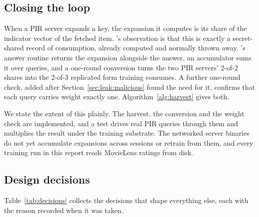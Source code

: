 \subsection{Closing the loop}
\label{sec:design:harvest}

When a PIR server expands a key, the expansion it computes is its share of the
indicator vector of the fetched item. \pirsonaplain{}'s observation is that this
is exactly a secret-shared record of consumption, already computed and normally
thrown away. \sys{}'s answer routine returns the expansion alongside the answer,
an accumulator sums it over queries, and a one-round conversion turns the two PIR
servers' 2-of-2 shares into the 2-of-3 replicated form training consumes. A
further one-round check, added after Section~\ref{sec:leak:malicious} found the
need for it, confirms that each query carries weight exactly one.
Algorithm~\ref{alg:harvest} gives both.

We state the extent of this plainly. The harvest, the conversion and the weight
check are implemented, and a test drives real PIR queries through them and
multiplies the result under the training substrate. The networked server
binaries do not yet accumulate expansions across sessions or retrain from them,
and every training run in this report reads MovieLens ratings from disk.

\subsection{Design decisions}
\label{sec:design:decisions}

Table~\ref{tab:decisions} collects the decisions that shape everything else,
each with the reason recorded when it was taken.

